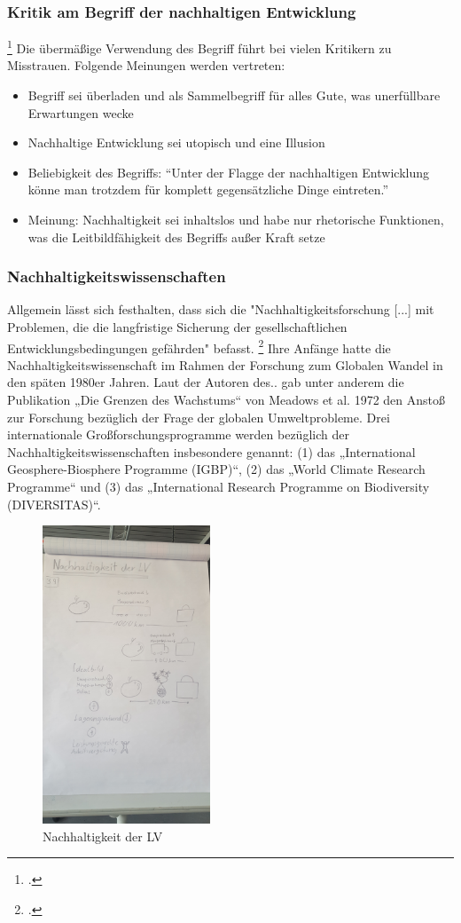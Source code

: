 \documentclass{scrartcl}
\begin{document}
\subsubsection{Kritik am Begriff der nachhaltigen Entwicklung}\footcite{NachhaltigeBrockhaus.de}
Die übermäßige Verwendung des Begriff führt bei vielen Kritikern zu Misstrauen. Folgende Meinungen werden vertreten:

\begin{itemize}
\item Begriff sei überladen und als Sammelbegriff für alles Gute, was unerfüllbare Erwartungen wecke
\item Nachhaltige Entwicklung sei utopisch und eine Illusion
\item Beliebigkeit des Begriffs: “Unter der Flagge der nachhaltigen Entwicklung könne man trotzdem für komplett gegensätzliche Dinge eintreten.”
\item Meinung: Nachhaltigkeit sei inhaltslos und habe nur rhetorische Funktionen, was die Leitbildfähigkeit des Begriffs außer Kraft setze
\end{itemize}

\subsubsection{Nachhaltigkeitswissenschaften}
Allgemein lässt sich festhalten, dass sich die "Nachhaltigkeitsforschung [...] mit Problemen, die die langfristige Sicherung der gesellschaftlichen Entwicklungsbedingungen gefährden" befasst.  \footcite[S.126]{MichelsenGrundlagenEntwicklung}
Ihre Anfänge hatte die Nachhaltigkeitswissenschaft im Rahmen der Forschung zum Globalen Wandel in den späten 1980er Jahren. Laut der Autoren des..  gab unter anderem die Publikation „Die Grenzen des Wachstums“ von Meadows et al. 1972 den Anstoß zur Forschung bezüglich der Frage der globalen Umweltprobleme.
Drei internationale Großforschungsprogramme werden bezüglich der Nachhaltigkeitswissenschaften insbesondere genannt: (1) das „International Geosphere-Biosphere Programme (IGBP)“, (2) das „World Climate Research Programme“ und (3) das
„International Research Programme on Biodiversity (DIVERSITAS)“.


\begin{figure}[h]
\centering
\includegraphics[width=5cm]{image_folder/skizze1.jpg}
\caption{Nachhaltigkeit der LV}
\label{fig:Skizze_Nachhaltigkeit}
\end{figure}
\end{document}
